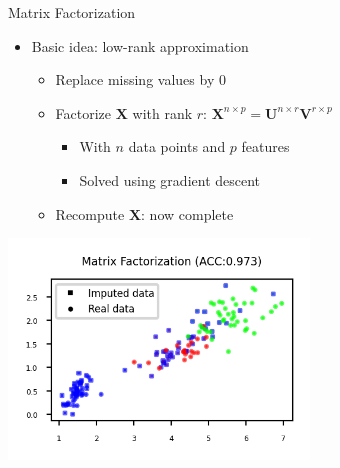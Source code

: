 \begin{frame}[allowframebreaks]{Matrix Factorization}

\begin{itemize}
    \item Basic idea: low-rank approximation
    \begin{itemize}
        \item Replace missing values by 0
        \item Factorize $\mathbf{X}$ with rank $r$: 
        $\mathbf{X}^{n \times p} = \mathbf{U}^{n \times r} \mathbf{V}^{r \times p}$
        \begin{itemize}
            \item With $n$ data points and $p$ features
            \item Solved using gradient descent
        \end{itemize}
        \item Recompute $\mathbf{X}$: now complete
    \end{itemize}
\end{itemize}

\vspace{1em}

\begin{center}
    \includegraphics[width=0.6\textwidth]{images/pre-processing/matrix-factorization.png}
\end{center}

\end{frame}


